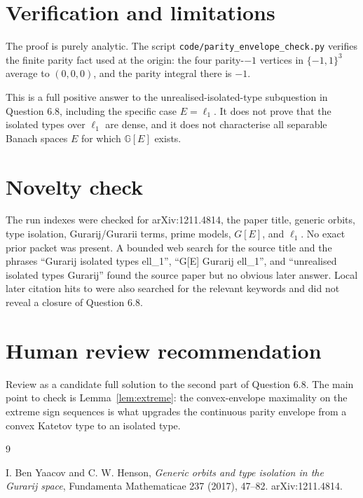 \documentclass[11pt]{article}
\begin{document}
\section*{Verification and limitations}

The proof is purely analytic.  The script
\texttt{code/parity\_envelope\_check.py} verifies the finite parity fact used
at the origin: the four parity-\(-1\) vertices in \(\{-1,1\}^3\) average to
\((0,0,0)\), and the parity integral there is \(-1\).

This is a full positive answer to the unrealised-isolated-type subquestion in
Question 6.8, including the specific case \(E=\ell_1\).  It does not prove that
the isolated types over \(\ell_1\) are dense, and it does not characterise all
separable Banach spaces \(E\) for which \(\mathbb G[E]\) exists.

\section*{Novelty check}

The run indexes were checked for arXiv:1211.4814, the paper title, generic
orbits, type isolation, Gurarij/Gurarii terms, prime models, \(G[E]\), and
\(\ell_1\).  No exact prior packet was present.  A bounded web search for the
source title and the phrases ``Gurarij isolated types ell\_1'', ``G[E] Gurarij
ell\_1'', and ``unrealised isolated types Gurarij'' found the source paper but
no obvious later answer.  Local later citation hits to \cite{BYH} were also
searched for the relevant keywords and did not reveal a closure of Question
6.8.

\section*{Human review recommendation}

Review as a candidate full solution to the second part of Question 6.8.  The
main point to check is Lemma~\ref{lem:extreme}: the convex-envelope maximality
on the extreme sign sequences is what upgrades the continuous parity envelope
from a convex Katetov type to an isolated type.

\begin{thebibliography}{9}

I. Ben Yaacov and C. W. Henson,
\emph{Generic orbits and type isolation in the Gurarij space},
Fundamenta Mathematicae 237 (2017), 47--82.
arXiv:1211.4814.

\end{thebibliography}
\end{document}
